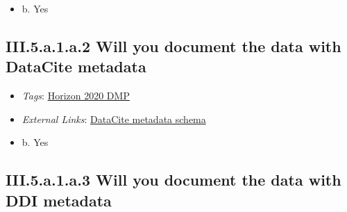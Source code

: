 \documentclass[a4paper,12pt]{report}
\begin{document}
\begin{itemize}
  \item[\CheckmarkBold] b. Yes
\end{itemize}




\subsection*{\protect\textcolor{colorSecId}{III.5.a.1.a.2} Will you document the data with DataCite metadata}

\label{b1df3c74-0b1f-4574-81c4-4cc2d780c1af.8c962e6f-17ee-4b22-8ebb-9f06f779e3b3.6d18bfff-0f53-469b-934e-9806dda9d4fb.1440afd6-d516-44f6-9c02-6abb13900b66.aec37b0d-490d-4d75-8814-8ed78ea5b8dd.035a37e5-1dda-44a1-8b66-d0612e99cd14}


\begin{itemize}
  \item \textit{Tags}: \ul{Horizon 2020 DMP}
  
  \item \textit{External Links}: \href{https://schema.datacite.org}{DataCite metadata schema}\end{itemize}




\begin{itemize}
  \item[\CheckmarkBold] b. Yes
\end{itemize}




\subsection*{\protect\textcolor{colorSecId}{III.5.a.1.a.3} Will you document the data with DDI metadata}

\label{b1df3c74-0b1f-4574-81c4-4cc2d780c1af.8c962e6f-17ee-4b22-8ebb-9f06f779e3b3.6d18bfff-0f53-469b-934e-9806dda9d4fb.1440afd6-d516-44f6-9c02-6abb13900b66.aec37b0d-490d-4d75-8814-8ed78ea5b8dd.9320bf04-824b-46b3-ae8b-55240e2d04b9}
\end{document}
